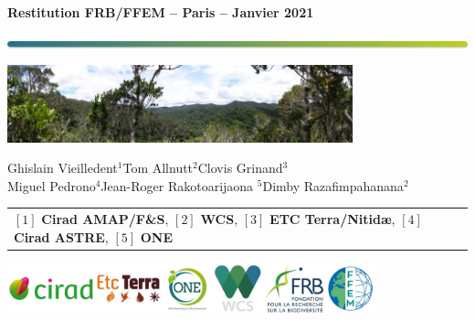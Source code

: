 
{
  \begin{frame}
  \begin{center}
  \small{\textbf{Restitution FRB/FFEM -- Paris -- Janvier 2021}}
  \end{center}
  \vspace{-0.5cm}
  \titlepage %
  \vspace{-3cm}
  \begin{center}
    \includegraphics[width=\textwidth]{figs/Barre_couleur}
    
    \vspace{0.25cm}
    
    \includegraphics[width=10cm]{figs/Banniere}
    
    \small{Ghislain Vieilledent$^{1}$\hspace{0.5cm}Tom Allnutt$^{2}$\hspace{0.5cm}Clovis
      Grinand$^{3}$\\Miguel Pedrono$^{4}$\hspace{0.5cm}Jean-Roger Rakotoarijaona
      $^{5}$\hspace{0.5cm}Dimby Razafimpahanana$^{2}$}
      
    \vspace{0.25cm}
    
    {\scriptsize
      \begin{tabular}{l}
        $[1]$ \textbf{Cirad AMAP/F\&S}, $[2]$ \textbf{WCS}, $[3]$ \textbf{ETC Terra/Nitid\ae}, $[4]$
        \textbf{Cirad ASTRE}, $[5]$ \textbf{ONE}  
      \end{tabular}
    }
    
    \includegraphics[width=0.8\textwidth]{figs/partners_logos}
    
  \end{center}
  \end{frame}
}

